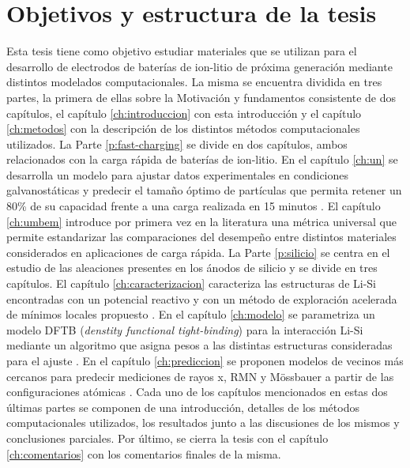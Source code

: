 \section{Objetivos y estructura de la tesis}

Esta tesis tiene como objetivo estudiar materiales que se utilizan para el 
desarrollo de electrodos de baterías de ion-litio de próxima generación mediante 
distintos modelados computacionales. 
La misma se encuentra dividida en tres partes, la primera de ellas sobre la 
Motivación y fundamentos consistente de dos capítulos, el capítulo 
\ref{ch:introduccion} con esta introducción y el capítulo \ref{ch:metodos} con la
descripción de los distintos métodos computacionales utilizados. 
La Parte \ref{p:fast-charging} se divide en dos capítulos, ambos relacionados con 
la carga rápida de baterías de ion-litio. En el capítulo \ref{ch:un} se 
desarrolla un modelo para ajustar datos experimentales en condiciones 
galvanostáticas y predecir el tamaño óptimo de partículas que permita retener un 
80\% de su capacidad frente a una carga realizada en 15 minutos 
\cite{fernandez2023towards}. El capítulo \ref{ch:umbem} introduce por primera vez en la literatura una métrica 
universal que permite estandarizar las comparaciones del desempeño entre 
distintos materiales considerados en aplicaciones de carga rápida.
La Parte \ref{p:silicio} se centra en el estudio de las aleaciones presentes en 
los ánodos de silicio y se divide en tres capítulos. El capítulo 
\ref{ch:caracterizacion} caracteriza las estructuras de Li-Si encontradas con 
un potencial reactivo y con un método de exploración acelerada de mínimos locales
propuesto \cite{fernandez2021characterization}. En el capítulo \ref{ch:modelo} se
parametriza un modelo DFTB (\textit{denstity functional tight-binding}) para la 
interacción Li-Si mediante un algoritmo que asigna pesos a las distintas 
estructuras consideradas para el ajuste \cite{oviedo2023}. En el capítulo 
\ref{ch:prediccion} se proponen modelos de vecinos más cercanos para predecir 
mediciones de rayos x, RMN y Mössbauer a partir de las configuraciones atómicas
\cite{fernandez2023nmr}.
Cada uno de los capítulos mencionados en estas dos últimas partes se componen
de una introducción, detalles de los métodos computacionales utilizados, los 
resultados junto a las discusiones de los mismos y conclusiones parciales.
Por último, se cierra la tesis con el capítulo \ref{ch:comentarios} con los 
comentarios finales de la misma.

